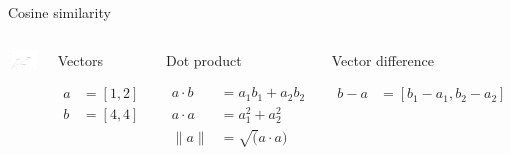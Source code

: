 \documentclass[
  10pt,
  ignorenonframetext,
  x11names, dvipsnames, bibspacing,natbib, table]{beamer}
\begin{document}
\begin{frame}{Cosine similarity}
\protect\hypertarget{cosine-similarity-1}{}
\begin{columns}
    

\begin{center}\includegraphics[width=1\linewidth]{presentationBoston_files/figure-beamer/cosine2-1} \end{center}



\footnotesize 


\begin{block}{Vectors}

\begin{align*}
a  & = [1,2]\\
b  &= [4,4]
\end{align*}

\end{block}


\begin{block}{Dot product}

\begin{align*}
a \cdot b & = a_1 b_1 + a_2 b_2\\
a \cdot a & = a_1^2 + a_2 ^ 2 \\
\lVert a\rVert & = \sqrt(a \cdot a)
\end{align*}

\end{block}


\begin{block}{Vector difference}

\begin{align*}
b - a & = [b_1- a_1, b_2 - a_2 ]
\end{align*}

\end{block}

\end{columns}
\end{frame}
\end{document}
